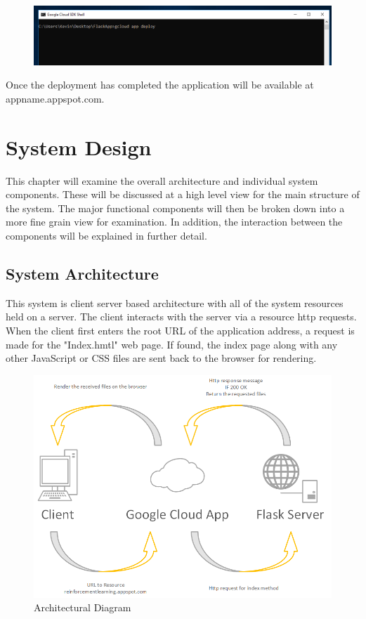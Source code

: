 \begin{figure}[H]
	\centering
	\includegraphics[width=0.7\linewidth]{img/DeployCmd}
	\caption{}
	\label{fig:deploycmd}
\end{figure}
Once the deployment has completed the application will be available at appname.appspot.com. ~\cite{FlaskAppGoolge:online}


\chapter{System Design}
This chapter will examine the overall architecture and individual system components. These will be discussed at a high level view for the main structure of the system. The major functional components will then be broken down into a more fine grain view for examination. In addition, the interaction between the components will be explained in further detail.

\section{System Architecture}
This system is client server based architecture with all of the system resources held on a server. The client interacts with the server via a resource http requests. When the client first enters the root URL of the application address, a request is made for the "Index.hmtl" web page. If found, the index page along with any other JavaScript or CSS files are sent back to the browser for rendering.

\begin{figure}[H]
	\centering
	\includegraphics[width=0.7\linewidth]{img/Architecture}
	\caption{Architectural Diagram}
	\label{fig:architecture}
\end{figure}

